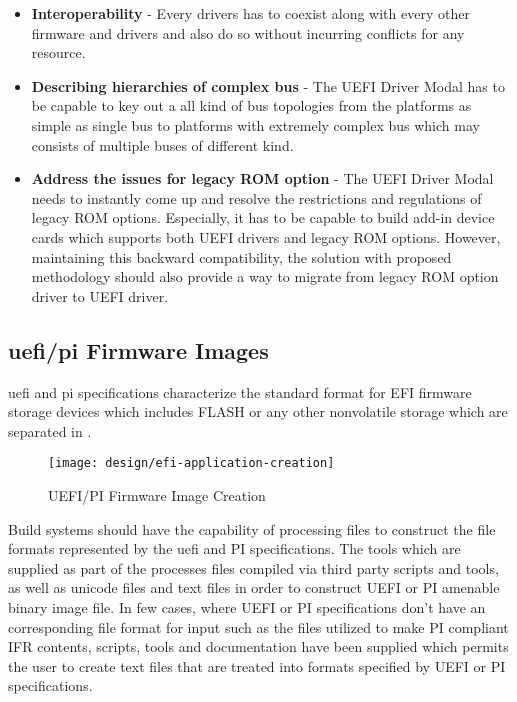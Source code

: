 \begin{itemize}
	\item \textbf{Interoperability} -  Every drivers has to coexist along with every other firmware and drivers and also do so without incurring conflicts for any resource.
	\item \textbf{Describing hierarchies of complex bus} - The UEFI Driver Modal has to be capable to key out a all kind of bus topologies from the platforms as simple as single bus to platforms with extremely complex bus which may consists of multiple buses of different kind.
	\item \textbf{Address the issues for legacy ROM option} - The UEFI Driver Modal needs to instantly come up and resolve the restrictions and regulations of legacy ROM options. Especially, it has to be capable to build add-in device cards which supports both UEFI drivers and legacy ROM options. However, maintaining this backward compatibility, the solution with proposed methodology should also provide a way to migrate from legacy ROM option driver to UEFI driver.
\end{itemize}

\subsection{\gls{uefi}/\gls{pi} Firmware Images}
\gls{uefi} and \gls{pi} specifications characterize the standard format for EFI firmware storage devices which includes FLASH or any other nonvolatile storage which are separated in .
\begin{figure}[!htbp]
  \centering
  \texttt{[image: design/efi-application-creation]}
  \caption{UEFI/PI Firmware Image Creation}\label{fig:design-efi-application-creation}
\end{figure}

Build systems should have the capability of processing files to construct the file formats represented by the \gls{uefi} and PI specifications. The tools which are supplied as part of the  processes files compiled via third party scripts and tools, as well as unicode files and text files in order to construct UEFI or PI amenable binary image file. In few cases, where UEFI or PI specifications don't have an corresponding file format for input such as the  files utilized to make PI compliant IFR contents, scripts, tools and documentation have been supplied which permits the user to create text files that are treated into formats specified by UEFI or PI specifications.


